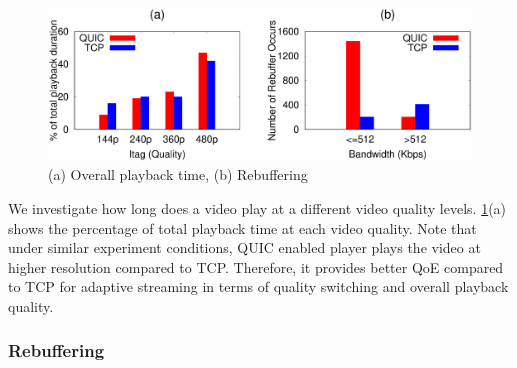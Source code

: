 \begin{figure}[!t]
	\captionsetup[subfigure]{}
	\begin{center}
        \includegraphics[width=0.9\linewidth]{img/plotdata/metric/time_duration_percent_rebuffering}
		\caption{\label{fig:bitrate_rebuffering}(a) Overall playback time,  (b) Rebuffering}
	\end{center}
\end{figure}

We investigate how long does a video play at a different video quality levels.
\fig\ref{fig:bitrate_rebuffering}(a) shows the percentage of total playback time at each video quality. 
Note that under similar experiment conditions, QUIC enabled player plays the video at higher resolution compared to TCP. Therefore, it provides better QoE compared to TCP for adaptive streaming in terms of quality switching and overall playback quality. 



\subsubsection{Rebuffering}

